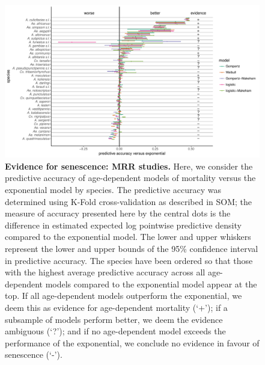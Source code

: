 \documentclass[12pt]{article}
\begin{document}
\begin{figure}[h]
	\centerline{\includegraphics[width=1.3\textwidth]{./Figure_files/mrr_elpd_vs_exponential_ordered.pdf}}
	\caption{\textbf{Evidence for senescence: MRR studies.} Here, we consider the predictive accuracy of age-dependent models of mortality versus the exponential model by species. The predictive accuracy was determined using K-Fold cross-validation as described in SOM; the measure of accuracy presented here by the central dots is the difference in estimated expected log pointwise predictive density compared to the exponential model. The lower and upper whiskers represent the lower and upper bounds of the 95\% confidence interval in predictive accuracy. The species have been ordered so that those with the highest average predictive accuracy across all age-dependent models compared to the exponential model appear at the top. If all age-dependent models outperform the exponential, we deem this as evidence for age-dependent mortality (`+'); if a subsample of models perform better, we deem the evidence ambiguous (`?'); and if no age-dependent model exceeds the performance of the exponential, we conclude no evidence in favour of senescence (`-').}
	\label{fig:mrr_elpd}
\end{figure}
\end{document}
